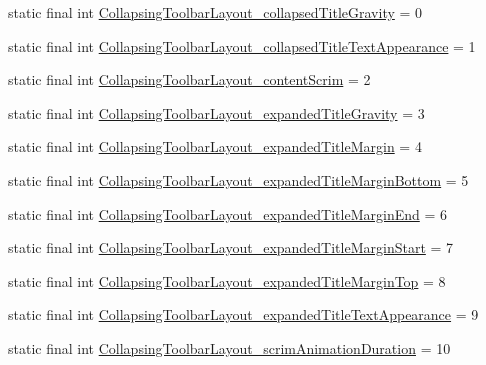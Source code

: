 \begin{DoxyCompactItemize}
\item 
static final int \mbox{\hyperlink{classandroid_1_1support_1_1design_1_1_r_1_1styleable_ab85cd00fd4e4297fd0e0de46fa282785}{Collapsing\+Toolbar\+Layout\+\_\+collapsed\+Title\+Gravity}} = 0
\item 
static final int \mbox{\hyperlink{classandroid_1_1support_1_1design_1_1_r_1_1styleable_ab001e6f6331a614848c62ab802482392}{Collapsing\+Toolbar\+Layout\+\_\+collapsed\+Title\+Text\+Appearance}} = 1
\item 
static final int \mbox{\hyperlink{classandroid_1_1support_1_1design_1_1_r_1_1styleable_ac385082b349bba84c2cbce41cc926062}{Collapsing\+Toolbar\+Layout\+\_\+content\+Scrim}} = 2
\item 
static final int \mbox{\hyperlink{classandroid_1_1support_1_1design_1_1_r_1_1styleable_a22ca6e930c13beba31f8d203d3fe975c}{Collapsing\+Toolbar\+Layout\+\_\+expanded\+Title\+Gravity}} = 3
\item 
static final int \mbox{\hyperlink{classandroid_1_1support_1_1design_1_1_r_1_1styleable_a94ebf42f82b453a27b237b0bebf8ae72}{Collapsing\+Toolbar\+Layout\+\_\+expanded\+Title\+Margin}} = 4
\item 
static final int \mbox{\hyperlink{classandroid_1_1support_1_1design_1_1_r_1_1styleable_a6b5972f1871c56095c3fd4dfd0d87d48}{Collapsing\+Toolbar\+Layout\+\_\+expanded\+Title\+Margin\+Bottom}} = 5
\item 
static final int \mbox{\hyperlink{classandroid_1_1support_1_1design_1_1_r_1_1styleable_abf4153c9e38ee5d38f3f60f9ce772c61}{Collapsing\+Toolbar\+Layout\+\_\+expanded\+Title\+Margin\+End}} = 6
\item 
static final int \mbox{\hyperlink{classandroid_1_1support_1_1design_1_1_r_1_1styleable_afd17a6349c12e66bd2ec7543b8aea927}{Collapsing\+Toolbar\+Layout\+\_\+expanded\+Title\+Margin\+Start}} = 7
\item 
static final int \mbox{\hyperlink{classandroid_1_1support_1_1design_1_1_r_1_1styleable_ac20bf3c3187cbfe0e8d3d38f0f240bc7}{Collapsing\+Toolbar\+Layout\+\_\+expanded\+Title\+Margin\+Top}} = 8
\item 
static final int \mbox{\hyperlink{classandroid_1_1support_1_1design_1_1_r_1_1styleable_a5810888dea70dffb7d52060a911d78aa}{Collapsing\+Toolbar\+Layout\+\_\+expanded\+Title\+Text\+Appearance}} = 9
\item 
static final int \mbox{\hyperlink{classandroid_1_1support_1_1design_1_1_r_1_1styleable_a90a53847f02d35e4468e56f400cfed3a}{Collapsing\+Toolbar\+Layout\+\_\+scrim\+Animation\+Duration}} = 10
\item 

\end{DoxyCompactItemize}
